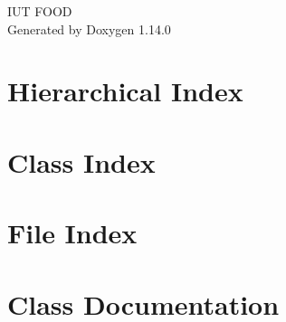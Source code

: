 \documentclass[twoside]{book}
\newcommand{\+}{\discretionary{\mbox{\scriptsize$\hookleftarrow$}}{}{}}
\newcommand{\clearemptydoublepage}{%
    \newpage{\pagestyle{empty}\cleardoublepage}%
  }
\begin{document}
  \raggedbottom
    \hypersetup{pageanchor=false,
                bookmarksnumbered=true,
                pdfencoding=unicode
               }
  \begin{titlepage}
  \vspace*{7cm}
  \begin{center}%
  {\Large IUT FOOD}\\
  \vspace*{1cm}
  {\large Generated by Doxygen 1.14.0}\\
  \end{center}
  \end{titlepage}
  \clearemptydoublepage
  \tableofcontents
  \clearemptydoublepage
  \hypersetup{pageanchor=true}
\chapter{Hierarchical Index}

\chapter{Class Index}

\chapter{File Index}

\chapter{Class Documentation}































\end{document}
